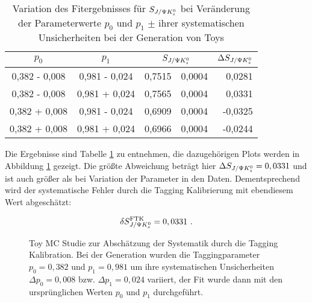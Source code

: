 \begin{table}[hptb]
\centering
\caption{Variation des Fitergebnisses für $S_{J/\Psi K_s^0}$ bei Veränderung der Parameterwerte $p_0$ und $p_1$ $\pm$ ihrer systematischen Unsicherheiten bei der Generation von Toys}
\label{tab:syst_fit_calib_toys}
\begin{tabular}{cc|r@{$\pm$}l|r}
\hline\hline
$p_0$  &  $p_1$  &  \multicolumn{2}{c|}{$S_{J/\Psi K_s^0}$}  & $\Delta S_{J/\Psi K_s^0}$   \\ \hline
0,382 - 0,008  &  0,981 - 0,024  &  0,7515 & 0,0004  &   0,0281 \\
0,382 - 0,008  &  0,981 + 0,024  &  0,7565 & 0,0004  &   0,0331 \\
0,382 + 0,008  &  0,981 - 0,024  &  0,6909 & 0,0004  &  -0,0325 \\
0,382 + 0,008  &  0,981 + 0,024  &  0,6966 & 0,0004  &  -0,0244 \\
\hline\hline
\end{tabular}
\end{table}

Die Ergebnisse sind Tabelle \ref{tab:syst_fit_calib_toys} zu entnehmen, die dazugehörigen Plots werden in Abbildung \ref{fig:toys_tag_calib} gezeigt. Die größte Abweichung beträgt hier $\Delta S_{J/\Psi K_s^0} = 0,0331$ und ist auch größer als bei Variation der Parameter in den Daten. Dementsprechend wird der systematische Fehler durch die Tagging Kalibrierung mit ebendiesem Wert abgeschätzt:

\begin{align}
\delta S_{J/\Psi K_s^0}^{\text{FTK}} = 0,0331\ .
\end{align}

\begin{figure}[hptb]
\centering
{}
\caption{Toy MC Studie zur Abschätzung der Systematik durch die Tagging Kalibration. Bei der Generation wurden die Taggingparameter $p_0=0,382$ und $p_1=0,981$ um ihre systematischen Unsicherheiten $\Delta p_0 = 0,008$ bzw. $\Delta p_1 = 0,024$ variiert, der Fit wurde dann mit den ursprünglichen Werten $p_0$ und $p_1$ durchgeführt.}
\label{fig:toys_tag_calib}
\end{figure}


